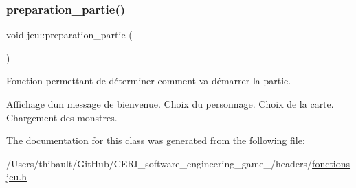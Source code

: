 \mbox{\label{classjeu_adf5ffb1565eebcd8540ff1ef4626abaf}} 
\subsubsection{\texorpdfstring{preparation\+\_\+partie()}{preparation\_partie()}}
{\footnotesize\ttfamily void jeu\+::preparation\+\_\+partie (\begin{DoxyParamCaption}{ }\end{DoxyParamCaption})}



Fonction permettant de déterminer comment va démarrer la partie. 

Affichage d\textquotesingle{}un message de bienvenue. Choix du personnage. Choix de la carte. Chargement des monstres. 

The documentation for this class was generated from the following file\+:\begin{DoxyCompactItemize}
\item 
/\+Users/thibault/\+Git\+Hub/\+C\+E\+R\+I\+\_\+software\+\_\+engineering\+\_\+game\+\_/headers/\hyperlink{fonctionsjeu_8h}{fonctionsjeu.\+h}\end{DoxyCompactItemize}
